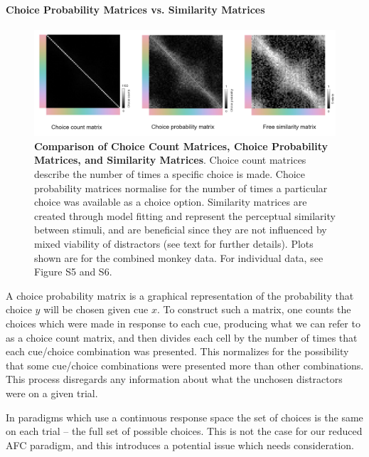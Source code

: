 \paragraph{Choice Probability Matrices vs. Similarity Matrices}

\begin{figure}
    \begin{fullwidth}
    \centering
      \includegraphics[width=\textwidth,]{../Figures/flat/F7_choiceProbVsSim.png}
           \caption{\textbf{Comparison of Choice Count Matrices, Choice Probability Matrices, and Similarity Matrices}.
           Choice count matrices describe the number of times a specific choice is made. 
           Choice probability matrices normalise for the number of times a particular choice was available as a choice option. 
           Similarity matrices are created through model fitting and represent the perceptual similarity between stimuli, and are beneficial since they are not influenced by mixed viability of distractors (see text for further details).
           Plots shown are for the combined monkey data. For individual data, see Figure S5 and S6.}
		\label{fig:choiceProbVsSim}
    \end{fullwidth}
\end{figure}

A choice probability matrix is a graphical representation of the probability that choice $y$ will be chosen given cue $x$.
To construct such a matrix, one counts the choices which were made in response to each cue, producing what we can refer to as a choice count matrix, and then divides each cell by the number of times that each cue/choice combination was presented. 
This normalizes for the possibility that some cue/choice combinations were presented more than other combinations. 
This process disregards any information about what the unchosen distractors were on a given trial.

In paradigms which use a continuous response space the set of choices is the same on each trial – the full set of possible choices. 
This is not the case for our reduced AFC paradigm, and this introduces a potential issue which needs consideration.

